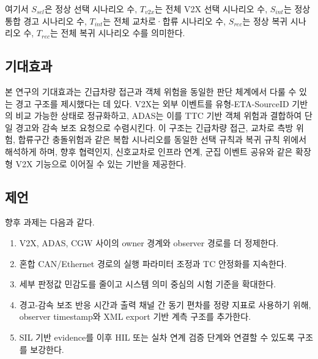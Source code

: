 \documentclass[11pt,a4paper]{article}
\begin{document}
\noindent\footnotesize 여기서 $S_{sel}$은 정상 선택 시나리오 수, $T_{v2x}$는 전체 V2X 선택 시나리오 수, $S_{int}$는 정상 통합 경고 시나리오 수, $T_{int}$는 전체 교차로·합류 시나리오 수, $S_{rec}$는 정상 복귀 시나리오 수, $T_{rec}$는 전체 복귀 시나리오 수를 의미한다.\normalsize

\subsection{기대효과}

본 연구의 기대효과는 긴급차량 접근과 객체 위험을 동일한 판단 체계에서 다룰 수 있는 경고 구조를 제시했다는 데 있다. V2X는 외부 이벤트를 유형-ETA-SourceID 기반의 비교 가능한 상태로 정규화하고, ADAS는 이를 TTC 기반 객체 위험과 결합하여 단일 경고와 감속 보조 요청으로 수렴시킨다. 이 구조는 긴급차량 접근, 교차로 측방 위험, 합류구간 충돌위험과 같은 복합 시나리오를 동일한 선택 규칙과 복귀 규칙 위에서 해석하게 하며, 향후 협력인지, 신호교차로 인프라 연계, 군집 이벤트 공유와 같은 확장형 V2X 기능으로 이어질 수 있는 기반을 제공한다.

\subsection{제언}

향후 과제는 다음과 같다.

\begin{enumerate}[label=\arabic*.]
\item V2X, ADAS, CGW 사이의 owner 경계와 observer 경로를 더 정제한다.
\item 혼합 CAN/Ethernet 경로의 실행 파라미터 조정과 TC 안정화를 지속한다.
\item 세부 판정값 민감도를 줄이고 시스템 의미 중심의 시험 기준을 확대한다.
\item 경고-감속 보조 반응 시간과 출력 채널 간 동기 편차를 정량 지표로 사용하기 위해, observer timestamp와 XML export 기반 계측 구조를 추가한다.
\item SIL 기반 evidence를 이후 HIL 또는 실차 연계 검증 단계와 연결할 수 있도록 구조를 보강한다.
\end{enumerate}
\end{document}
